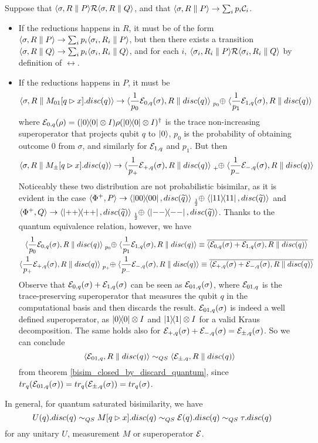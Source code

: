 Suppose that $\langle\sigma, R \parallel P\rangle \mathcal{R} \langle\sigma, R \parallel Q\rangle$, and that $\langle\sigma, R \parallel P\rangle \rightarrow \sum_i p_i \mathcal{C}_i$.\begin{itemize}
\item If the reductions happens in $R$, it must be of the form $\langle\sigma, R \parallel P\rangle \rightarrow \sum_i p_i \langle\sigma_i, R_i \parallel P\rangle$, but then there exists a transition $\langle\sigma, R \parallel Q\rangle \rightarrow \sum_i p_i \langle\sigma_i, R_i \parallel Q\rangle$, and for each $i$, $\langle\sigma_i, R_i \parallel P\rangle \mathcal{R} \langle\sigma_i, R_i \parallel Q\rangle$ by definition of $\rel$.
\item If the reductions happens in $P$, it must be 
 \[\confw{\sigma, R \parallel M_{01}[q \rhd x].disc(q)} \rightarrow \confw{\frac{1}{p_0}\sop_{0, q}(\sigma), R \parallel disc(q)} \psum{p_0} \confw{\frac{1}{p_1}\sop_{1, q}(\sigma), R \parallel disc(q)}\]
 where $\mathcal{E}_{0, q}(\rho) = (\ket{0}\!\!\bra{0}\otimes I) \rho (\ket{0}\!\!\bra{0} \otimes I)^\dagger$ is the trace non-increasing superoperator that projects qubit $q$ to $\ket{0}$, $p_0$ is the probability of obtaining outcome $0$ from $\sigma$, and similarly for $\mathcal{E}_{1, q }$ and $p_1$. But then  
 \[\confw{\sigma, R \parallel M_\pm[q \rhd x].disc(q)} \rightarrow \confw{\frac{1}{p_+}\sop_{+, q}(\sigma), R \parallel disc(q)} \psum{+} \confw{\frac{1}{p_-}\sop_{-, q}(\sigma), R \parallel disc(q)}
 \] 
 Noticeably these two distribution are not probabilistic bisimilar, as it is evident in the case $\confw{\Phi^+, P} \rightarrow \confw{\proj{00}, \discQ} \psum{\frac{1}{2}} \confw{\proj{11}, \discQ}$ and $\confw{\Phi^+, Q} \rightarrow \confw{\proj{++}, \discQ} \psum{\frac{1}{2}} \confw{\proj{--}, \discQ}$.  Thanks to the quantum equivalence relation, however, we have 
 \begin{gather*}
 \confw{\frac{1}{p_0}\sop_{0, q}(\sigma), R \parallel disc(q)} \psum{p_0} \confw{\frac{1}{p_1}\sop_{1, q}(\sigma), R \parallel disc(q)} \equiv \overline{\confw{\sop_{0, q}(\sigma) + \sop_{1, q}(\sigma), R \parallel disc(q)}}
 \\
 \confw{\frac{1}{p_+}\sop_{+, q}(\sigma), R \parallel disc(q)} \psum{p_+} \confw{\frac{1}{p_-}\sop_{-, q}(\sigma), R \parallel disc(q)} \equiv \overline{\confw{\sop_{+, q}(\sigma) + \sop_{-, q}(\sigma), R \parallel disc(q)}}
 \end{gather*}
 Observe that $\mathcal{E}_{0, q}(\sigma) + \mathcal{E}_{1, q}(\sigma)$ can be seen as $\mathcal{E}_{01, q}(\sigma)$, where $\mathcal{E}_{01, q}$ is the trace-preserving superoperator that measures the qubit $q$ in the computational basis and then discards the result. $\mathcal{E}_{01, q}(\sigma)$ is indeed a well defined superoperator, as $\ket{0}\!\!\bra{0}\otimes I$ and $\ket{1}\!\!\bra{1}\otimes I$ for a valid Kraus decomposition. The same holds also for $\mathcal{E}_{+, q}(\sigma) + \mathcal{E}_{-, q}(\sigma) = \mathcal{E}_{\pm, q}(\sigma)$. So we can conclude
 \[ \langle\mathcal{E}_{01,q},  R \parallel disc(q)\rangle \sim_{QS} \langle\mathcal{E}_{\pm,q},  R \parallel disc(q)\rangle
 \]
 from theorem \ref{bisim_closed_by_discard_quantum}, since $tr_q(\mathcal{E}_{01, q}(\sigma)) = tr_q(\mathcal{E}_{\pm, q}(\sigma)) = tr_q(\sigma)$.
\end{itemize}

In general, for quantum saturated bisimilarity, we have
\[	U(q).disc(q) \sim_{QS} M[q \rhd x].disc(q) \sim_{QS} \mathcal{E}(q).disc(q) \sim_{QS} \tau.disc(q) \]
for any unitary $U$, measurement $M$ or superoperator $\mathcal{E}$.


